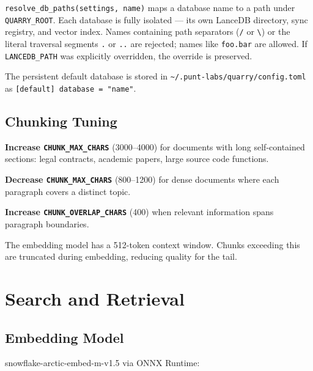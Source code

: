 \documentclass[a4paper,10pt]{article}
\begin{document}
\texttt{resolve\_db\_paths(settings, name)} maps a database name to a
path under \texttt{QUARRY\_ROOT}.  Each database is fully isolated ---
its own LanceDB directory, sync registry, and vector index.  Names containing path separators (\texttt{/} or
\texttt{\textbackslash}) or the literal traversal segments \texttt{.}
or \texttt{..} are rejected; names like \texttt{foo.bar} are allowed.
If \texttt{LANCEDB\_PATH} was explicitly overridden, the override is
preserved.

The persistent default database is stored in
\texttt{\~{}/.punt-labs/quarry/config.toml} as \texttt{[default] database = "name"}.

\subsection{Chunking Tuning}

\textbf{Increase \texttt{CHUNK\_MAX\_CHARS}} (3000--4000) for documents
with long self-contained sections: legal contracts, academic papers,
large source code functions.

\textbf{Decrease \texttt{CHUNK\_MAX\_CHARS}} (800--1200) for dense
documents where each paragraph covers a distinct topic.

\textbf{Increase \texttt{CHUNK\_OVERLAP\_CHARS}} (400) when relevant
information spans paragraph boundaries.

The embedding model has a 512-token context window.  Chunks exceeding
this are truncated during embedding, reducing quality for the tail.

\section{Search and Retrieval}

\subsection{Embedding Model}

snowflake-arctic-embed-m-v1.5 via ONNX Runtime:
\end{document}
